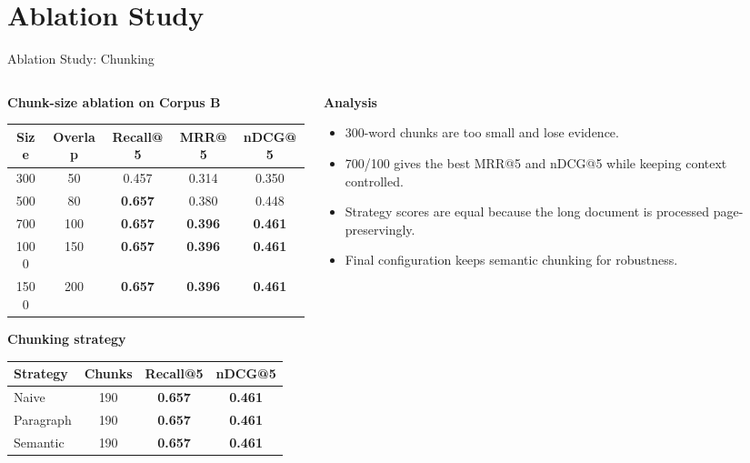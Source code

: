 \documentclass[10pt,aspectratio=169]{beamer}
\begin{document}
\section{Ablation Study}

\begin{frame}{Ablation Study: Chunking}
    \begin{columns}[T,totalwidth=\textwidth]
        \begin{column}{0.56\textwidth}
            \textbf{Chunk-size ablation on Corpus B}
            \scriptsize
            \begin{tabular}{ccccc}
                \toprule
                Size & Overlap & Recall@5 & MRR@5 & nDCG@5 \\
                \midrule
                300 & 50 & 0.457 & 0.314 & 0.350 \\
                500 & 80 & \textbf{0.657} & 0.380 & 0.448 \\
                700 & 100 & \textbf{0.657} & \textbf{0.396} & \textbf{0.461} \\
                1000 & 150 & \textbf{0.657} & \textbf{0.396} & \textbf{0.461} \\
                1500 & 200 & \textbf{0.657} & \textbf{0.396} & \textbf{0.461} \\
                \bottomrule
            \end{tabular}
            \vspace{0.7em}
            \textbf{Chunking strategy}
            \scriptsize
            \begin{tabular}{lccc}
                \toprule
                Strategy & Chunks & Recall@5 & nDCG@5 \\
                \midrule
                Naive & 190 & \textbf{0.657} & \textbf{0.461} \\
                Paragraph & 190 & \textbf{0.657} & \textbf{0.461} \\
                Semantic & 190 & \textbf{0.657} & \textbf{0.461} \\
                \bottomrule
            \end{tabular}
        \end{column}
        \begin{column}{0.40\textwidth}
            \textbf{Analysis}
            \begin{itemize}
                \item 300-word chunks are too small and lose evidence.
                \item 700/100 gives the best MRR@5 and nDCG@5 while keeping context controlled.
                \item Strategy scores are equal because the long document is processed page-preservingly.
                \item Final configuration keeps semantic chunking for robustness.
            \end{itemize}
        \end{column}
    \end{columns}
\end{frame}
\end{document}
